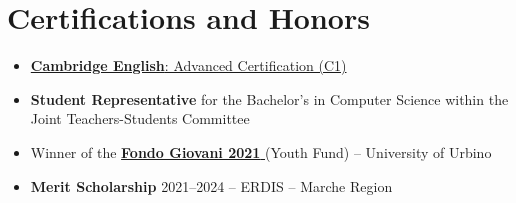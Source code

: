 \section{Certifications and Honors}
{\small
\begin{itemize}
    \item \href{https://1drv.ms/b/c/59480fd9770d79ac/Eax5DXfZD0gggFmgHwIAAAABSy_Si5bvBeZicdDFenE0ZQ?e=KdltGz}{\textbf{Cambridge English}: Advanced Certification (C1)}
    \item \textbf{Student Representative} for the Bachelor's in Computer Science within the Joint Teachers-Students Committee
    \item Winner of the \href{https://www.uniurb.it/news/43853}{\textbf{Fondo Giovani 2021} } (Youth Fund) – University of Urbino
    \item \textbf{Merit Scholarship} 2021–2024 – ERDIS – Marche Region
\end{itemize}
}
